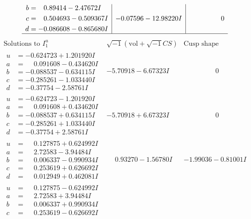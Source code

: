 \documentclass[1p]{elsarticle_modified}
\theoremstyle{definition}
\newcommand{\I}{\sqrt{-1}}
\begin{document}
$$\begin{array}{c|c|c}
\begin{aligned}
b &= \phantom{-}0.89414 - 2.47672 I \\
c &= \phantom{-}0.504693 - 0.509367 I \\
d &= -0.086608 - 0.865680 I\end{aligned}
 & -0.07596 - 12.98220 I & \phantom{-0.000000 } 0\\
 \hline 
 \end{array}$$\newpage$$\begin{array}{c|c|c}  
\text{Solutions to }I^u_{1}& \I (\text{vol} + \sqrt{-1}CS) & \text{Cusp shape}\\
 \hline 
\begin{aligned}
u &= -0.624723 + 1.201920 I \\
a &= \phantom{-}0.091608 - 0.434620 I \\
b &= -0.088537 - 0.634115 I \\
c &= -0.285261 - 1.033440 I \\
d &= -0.37754 - 2.58761 I\end{aligned}
 & -5.70918 - 6.67323 I & \phantom{-0.000000 } 0 \\ \hline\begin{aligned}
u &= -0.624723 - 1.201920 I \\
a &= \phantom{-}0.091608 + 0.434620 I \\
b &= -0.088537 + 0.634115 I \\
c &= -0.285261 + 1.033440 I \\
d &= -0.37754 + 2.58761 I\end{aligned}
 & -5.70918 + 6.67323 I & \phantom{-0.000000 } 0 \\ \hline\begin{aligned}
u &= \phantom{-}0.127875 + 0.624992 I \\
a &= \phantom{-}2.72583 - 3.94484 I \\
b &= \phantom{-}0.006337 - 0.990934 I \\
c &= \phantom{-}0.253619 + 0.626692 I \\
d &= \phantom{-}0.012949 + 0.462081 I\end{aligned}
 & \phantom{-}0.93270 - 1.56780 I & -1.99036 - 0.81001 I \\ \hline\begin{aligned}
u &= \phantom{-}0.127875 - 0.624992 I \\
a &= \phantom{-}2.72583 + 3.94484 I \\
b &= \phantom{-}0.006337 + 0.990934 I \\
c &= \phantom{-}0.253619 - 0.626692 I \\

\end{aligned}
\end{array}$$
\end{document}
